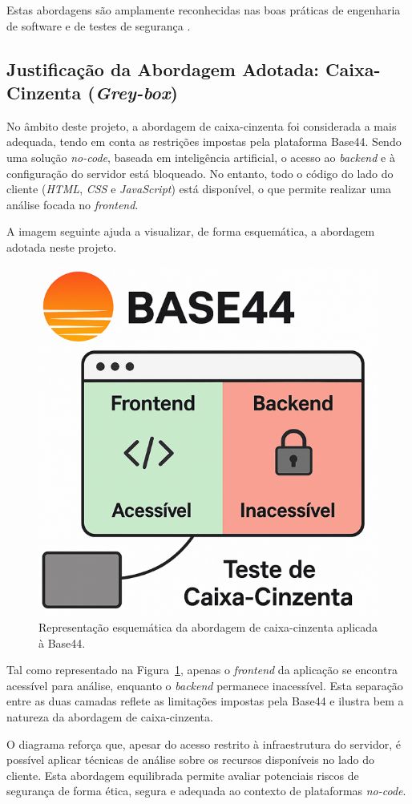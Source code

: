 Estas abordagens são amplamente reconhecidas nas boas práticas de engenharia de software e de testes de segurança \cite{ref37}.

\subsection{Justificação da Abordagem Adotada: Caixa-Cinzenta (\textit{Grey-box})}

No âmbito deste projeto, a abordagem de caixa-cinzenta foi considerada a mais adequada, tendo em conta as restrições impostas pela plataforma Base44. Sendo uma solução \textit{no-code}, baseada em inteligência artificial, o acesso ao \textit{backend} e à configuração do servidor está bloqueado. No entanto, todo o código do lado do cliente (\textit{HTML}, \textit{CSS} e \textit{JavaScript}) está disponível, o que permite realizar uma análise focada no \textit{frontend}.

A imagem seguinte ajuda a visualizar, de forma esquemática, a abordagem adotada neste projeto.

\begin{figure}
    \centering
    \includegraphics[width=0.4\linewidth]{imagens/diagrama.png}
    \caption{Representação esquemática da abordagem de caixa-cinzenta aplicada à Base44.}
    \label{fig:modelo_base44}
\end{figure}

Tal como representado na Figura~\ref{fig:modelo_base44}, apenas o \textit{frontend} da aplicação se encontra acessível para análise, enquanto o \textit{backend} permanece inacessível. Esta separação entre as duas camadas reflete as limitações impostas pela Base44 e ilustra bem a natureza da abordagem de caixa-cinzenta.

O diagrama reforça que, apesar do acesso restrito à infraestrutura do servidor, é possível aplicar técnicas de análise sobre os recursos disponíveis no lado do cliente. Esta abordagem equilibrada permite avaliar potenciais riscos de segurança de forma ética, segura e adequada ao contexto de plataformas \textit{no-code}.


